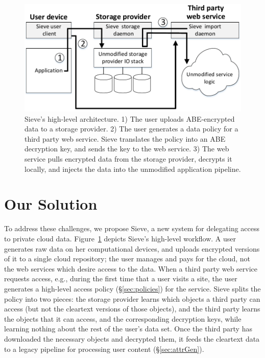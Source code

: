 \begin{figure}
  \centering
     \includegraphics{figs/arch.pdf}
     \caption[Sieve's high-level architecture]
     {Sieve's high-level architecture. 1) The user uploads
              ABE-encrypted data to a storage provider. 2) The user
              generates a data policy for a third party web
              service. Sieve translates the policy into an ABE
              decryption key, and sends the key to the web service.
              3) The web service pulls encrypted data from the
              storage provider, decrypts it locally, and injects
              the data into the unmodified application pipeline.}
  \label{fig:sieve}
\end{figure}

\section{Our Solution}

To address these challenges, we propose Sieve,
a new system for delegating access to
private cloud data. Figure~\ref{fig:sieve} depicts
Sieve's high-level workflow. A user generates
raw data on her computational devices, and
uploads encrypted versions of it to a single cloud
repository; the user manages and pays for the 
cloud, not the web services which
desire access to the data. When a third party web service
requests access, e.g., during the first
time that a user visits a site, the user
generates a high-level access policy (\S\ref{sec:policies})
for the service. Sieve splits the policy into
two pieces: the storage provider learns which
objects a third party can access (but not the
cleartext versions of those objects), and the
third party learns the objects that it can
access, and the corresponding decryption keys,
while learning nothing about the rest of the
user's data set. Once the third party has
downloaded the necessary objects and decrypted
them, it feeds the cleartext data to a legacy
pipeline for processing user content (\S\ref{sec:attrGen}).

